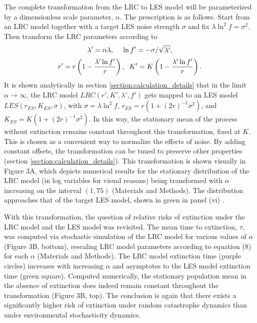 The complete transformation from the LRC to LES model will be parameterized by a dimensionless scale parameter, $\alpha$.  The prescription is as follows.  Start from an LRC model together with a target LES noise strength $\sigma$ and fix $\lambda\ln^2 f = \sigma^2$.  Then transform the LRC parameters according to
\begin{equation*}
\lambda' = \alpha \lambda,\text{\hspace{.4cm}}\ln f' = -\sigma/\sqrt{\lambda'},
\end{equation*}
\begin{equation}
r' = r\left(1- \frac{\lambda'\ln f'}{r}\right),\text{\hspace{.2cm}} K' = K\left(1  -\frac{\lambda'\ln f'}{r}\right).
\end{equation}
\noindent It is shown analytically in section \ref{section:calculation_details} that in the limit $\alpha \to \infty$, the LRC model $LRC(r',K',\lambda',f')$ gets mapped to an LES model $LES(r_{ES},K_{ES},\sigma)$, with $\sigma = \lambda\ln^2f$, $r_{ES} = r(1+(2r)^{-1}\sigma^2)$, and $K_{ES} = K(1+(2r)^{-1}\sigma^2)$.  In this way, the stationary mean of the process without extinction remains constant throughout this transformation, fixed at $K$.  This is chosen as a convenient way to normalize the effects of noise.  By adding constant offsets, the transformation can be tuned to preserve other properties (section \ref{section:calculation_details}).  This transformation is shown visually in Figure 3A, which depicts numerical results for the stationary distribution of the LRC model (in log variables for visual reasons) being transformed with $\alpha$ increasing on the interval $(1,75)$ (Materials and Methods).  The distribution approaches that of the target LES model, shown in green in panel (vi) .  

With this transformation, the question of relative risks of extinction under the LRC model and the LES model was revisited.  The mean time to extinction, $\tau$, was computed via stochastic simulation of the LRC model for various values of $\alpha$ (Figure 3B, bottom), rescaling LRC model parameters according to equation (8) for each $\alpha$ (Materials and Methods).  The LRC model extinction time (purple circles)  increases with increasing $\alpha$ and asymptotes to the LES model extinction time (green square).  Computed numerically, the stationary population mean in the absence of extinction does indeed remain constant throughout the transformation (Figure 3B, top).  The conclusion is again that there exists a significantly higher risk of extinction under random catastrophe dynamics than under environmental stochasticity dynamics.  

